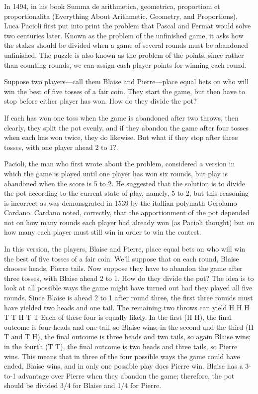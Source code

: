 In 1494, in his book Summa de arithmetica, geometrica, proportioni et proportionalita (Everything About Arithmetic, Geometry, and Proportions), Luca Pacioli first put into print the problem that Pascal and Fermat would solve two centuries later. Known as the problem of the unfinished game, it asks how the stakes should be divided when a game of several rounds must be abandoned unfinished. The puzzle is also known as the problem of the points, since rather than counting rounds, we can assign each player points for winning each round.

Suppose two players—call them Blaise and Pierre—place equal bets on who will win the best of five tosses of a fair coin. They start the game, but then have to stop before either player has won. How do they divide the pot?

If each has won one toss when the game is abandoned after two throws, then clearly, they split the pot evenly, and if they abandon the game after four tosses when each has won twice, they do likewise. But what if they stop after three tosses, with one player ahead 2 to 1?.

Pacioli, the man who first wrote about the problem, considered a version in which the game is played until one player has won six rounds, but play is abandoned when the score is 5 to 2. He suggested that the solution is to divide the pot according to the current state of play, namely, 5 to 2, but this reasoning is incorrect as was demonsgrated in 1539 by the itallian polymath Gerolamo Cardano. Cardano noted, correctly, that the apportionment of the pot depended not on how many rounds each player had already won (as Pacioli thought) but on how many each player must still win in order to win the contest.

In this version, the players, Blaise and Pierre, place equal bets on who will win the best of five tosses of a fair coin. We’ll suppose that on each round, Blaise chooses heads, Pierre tails. Now suppose they have to abandon the game after three tosses, with Blaise ahead 2 to 1. How do they divide the pot? The idea is to look at all possible ways the game might have turned out had they played all five rounds. Since Blaise is ahead 2 to 1 after round three, the first three rounds must have yielded two heads and one tail. The remaining two throws can yield H H H T T H T T Each of these four is equally likely. In the first (H H), the final outcome is four heads and one tail, so Blaise wins; in the second and the third (H T and T H), the final outcome is three heads and two tails, so again Blaise wins; in the fourth (T T), the final outcome is two heads and three tails, so Pierre wins. This means that in three of the four possible ways the game could have ended, Blaise wins, and in only one possible play does Pierre win. Blaise has a 3-to-1 advantage over Pierre when they abandon the game; therefore, the pot should be divided 3/4 for Blaise and 1/4 for Pierre.

